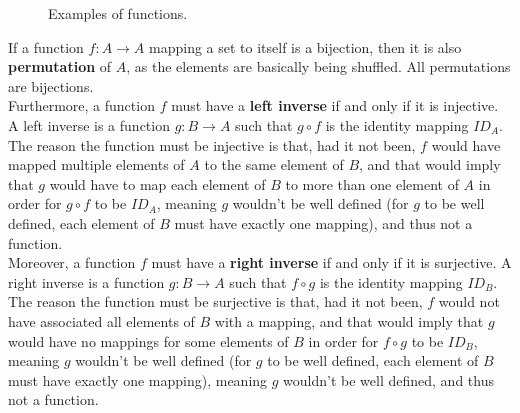\documentclass[12pt]{article}
\begin{document}
\begin{figure}[H]
        
        \caption{\label{fig:figure1} Examples of functions.}
    \end{figure}


    If a function $f: A \rightarrow A$ mapping a set to itself
    is a bijection,
    then it is also \textbf{permutation} of $A$,
    as the elements are basically being shuffled.
    All permutations are bijections. \\

    
    Furthermore, a function $f$ must have a \textbf{left inverse}
    if and only if it is injective.
    A left inverse is a function $g: B \rightarrow A$
    such that $g \circ f$ is the identity mapping $ID_A$. \\
    The reason the function must be injective is that,
    had it not been,
    $f$ would have mapped multiple elements of $A$
    to the same element of $B$,
    and that would imply that $g$ would have to map each element
    of $B$ to more than one element of $A$
    in order for $g \circ f$ to be $ID_A$,
    meaning $g$ wouldn't be well defined
    (for $g$ to be well defined,
    each element of $B$ must have exactly one mapping),
    and thus not a function. \\

    Moreover, a function $f$ must have a \textbf{right inverse}
    if and only if it is surjective.
    A right inverse is a function $g: B \rightarrow A$
    such that $f \circ g$ is the identity mapping $ID_B$. \\
    The reason the function must be surjective is that,
    had it not been,
    $f$ would not have associated all elements of $B$ with a mapping,
    and that would imply that $g$ would have
    no mappings for some elements of $B$
    in order for $f \circ g$ to be $ID_B$,
    meaning $g$ wouldn't be well defined
    (for $g$ to be well defined,
    each element of $B$ must have exactly one mapping),
    meaning $g$ wouldn't be well defined,
    and thus not a function. \\
\end{document}

